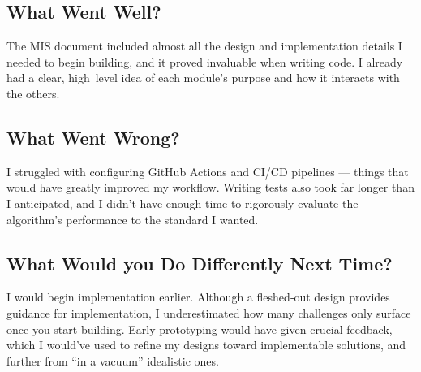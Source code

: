 \documentclass{article}
\begin{document}
\subsection{What Went Well?}
The MIS document included almost all the design and implementation details I needed to begin building, and it proved invaluable when writing code. I already had a clear, high level idea of each module’s purpose and how it interacts with the others.

\subsection{What Went Wrong?}
I struggled with configuring GitHub Actions and CI/CD pipelines — things that would have greatly improved my workflow. Writing tests also took far longer than I anticipated, and I didn’t have enough time to rigorously evaluate the algorithm’s performance to the standard I wanted.

\subsection{What Would you Do Differently Next Time?}
I would begin implementation earlier. Although a fleshed‑out design provides guidance for implementation, I underestimated how many challenges only surface once you start building. Early prototyping would have given crucial feedback, which I would've used to refine my designs toward  implementable solutions, and further from ``in a vacuum'' idealistic ones.
\end{document}
